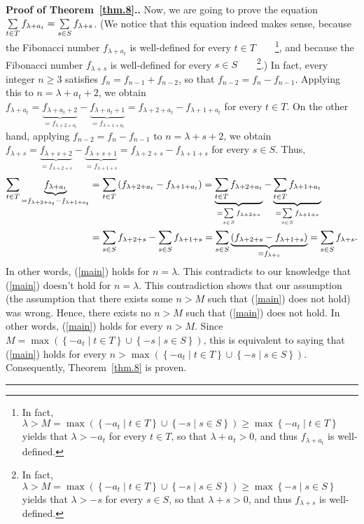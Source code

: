 \documentclass[numbers=enddot,12pt,final,onecolumn,notitlepage]{scrartcl}%
\numberwithin{exer}{section}
\theoremstyle{definition}
\newenvironment{proof}[1][Proof]{\noindent\textbf{#1.} }{\ \rule{0.5em}{0.5em}}
\let\sumnonlimits\sum
\renewcommand{\sum}{\sumnonlimits\limits}
\begin{document}
\begin{proof}[Proof of Theorem~\ref{thm.8}.]
Now, we are going to prove the equation $\sum\limits_{t\in T}f_{\lambda+a_{t}%
}=\sum\limits_{s\in S}f_{\lambda+s}$. (We notice that this equation indeed
makes sense, because the Fibonacci number $f_{\lambda+a_{t}}$ is well-defined
for every $t\in T$\ \ \ \ \footnote{In fact, $\lambda>M=\max\left(  \left\{
-a_{t}\mid t\in T\right\}  \cup\left\{  -s\mid s\in S\right\}  \right)
\geq\max\left\{  -a_{t}\mid t\in T\right\}  $ yields that $\lambda>-a_{t}$ for
every $t\in T$, so that $\lambda+a_{t}>0$, and thus $f_{\lambda+a_{t}}$ is
well-defined.}, and because the Fibonacci number $f_{\lambda+s}$ is
well-defined for every $s\in S$\ \ \ \ \footnote{In fact, $\lambda
>M=\max\left(  \left\{  -a_{t}\mid t\in T\right\}  \cup\left\{  -s\mid s\in
S\right\}  \right)  \geq\max\left\{  -s\mid s\in S\right\}  $ yields that
$\lambda>-s$ for every $s\in S$, so that $\lambda+s>0$, and thus
$f_{\lambda+s}$ is well-defined.}.) In fact, every integer $n\geq3$ satisfies
$f_{n}=f_{n-1}+f_{n-2}$, so that $f_{n-2}=f_{n}-f_{n-1}$. Applying this to
$n=\lambda+a_{t}+2$, we obtain $f_{\lambda+a_{t}}=\underbrace{f_{\lambda
+a_{t}+2}}_{=f_{\lambda+2+a_{t}}}-\underbrace{f_{\lambda+a_{t}+1}%
}_{=f_{\lambda+1+a_{t}}}=f_{\lambda+2+a_{t}}-f_{\lambda+1+a_{t}}$ for every
$t\in T$. On the other hand, applying $f_{n-2}=f_{n}-f_{n-1}$ to
$n=\lambda+s+2$, we obtain $f_{\lambda+s}=\underbrace{f_{\lambda+s+2}%
}_{=f_{\lambda+2+s}}-\underbrace{f_{\lambda+s+1}}_{=f_{\lambda+1+s}%
}=f_{\lambda+2+s}-f_{\lambda+1+s}$ for every $s\in S$. Thus,%
\begin{align*}
\sum\limits_{t\in T}\underbrace{f_{\lambda+a_{t}}}_{=f_{\lambda+2+a_{t}%
}-f_{\lambda+1+a_{t}}}  &  =\sum\limits_{t\in T}\left(  f_{\lambda+2+a_{t}%
}-f_{\lambda+1+a_{t}}\right)  =\underbrace{\sum\limits_{t\in T}f_{\lambda
+2+a_{t}}}_{=\sum\limits_{s\in S}f_{\lambda+2+s}}-\underbrace{\sum
\limits_{t\in T}f_{\lambda+1+a_{t}}}_{=\sum\limits_{s\in S}f_{\lambda+1+s}}\\
&  =\sum\limits_{s\in S}f_{\lambda+2+s}-\sum\limits_{s\in S}f_{\lambda
+1+s}=\sum\limits_{s\in S}\underbrace{\left(  f_{\lambda+2+s}-f_{\lambda
+1+s}\right)  }_{=f_{\lambda+s}}=\sum\limits_{s\in S}f_{\lambda+s}.
\end{align*}
In other words, (\ref{main}) holds for $n=\lambda$. This contradicts to our
knowledge that (\ref{main}) doesn't hold for $n=\lambda$. This contradiction
shows that our assumption (the assumption that there exists some $n>M$ such
that (\ref{main}) does not hold) was wrong. Hence, there exists no $n>M$ such
that (\ref{main}) does not hold. In other words, (\ref{main}) holds for every
$n>M$. Since $M=\max\left(  \left\{  -a_{t}\mid t\in T\right\}  \cup\left\{
-s\mid s\in S\right\}  \right)  $, this is equivalent to saying that
(\ref{main}) holds for every $n>\max\left(  \left\{  -a_{t}\mid t\in
T\right\}  \cup\left\{  -s\mid s\in S\right\}  \right)  $. Consequently,
Theorem~\ref{thm.8} is proven.
\end{proof}
\end{document}

